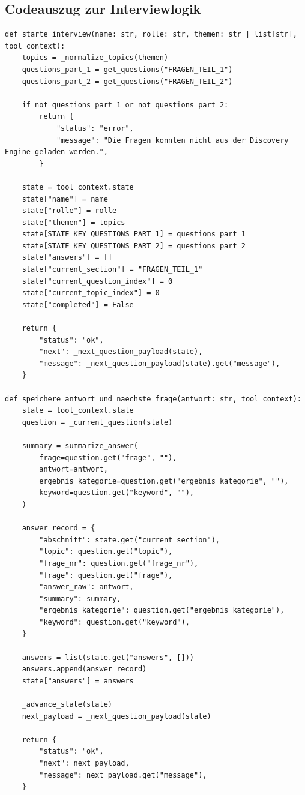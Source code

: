 \documentclass[
  10pt,
  ngerman,
  a4paper,
  toc=graduated,
  numbers=noenddot,
  headings=standardclasses,
  nonumberlist
]{scrartcl}
\begin{document}
\newpage
\subsection{Codeauszug zur Interviewlogik}
\label{anhang_interviewlogik}

\begin{lstlisting}[style=pythoncode, numbers=none, caption={Session State, Fragewechsel und Antwortspeicherung}, label={lst:interviewlogik}]
def starte_interview(name: str, rolle: str, themen: str | list[str], tool_context):
    topics = _normalize_topics(themen)
    questions_part_1 = get_questions("FRAGEN_TEIL_1")
    questions_part_2 = get_questions("FRAGEN_TEIL_2")

    if not questions_part_1 or not questions_part_2:
        return {
            "status": "error",
            "message": "Die Fragen konnten nicht aus der Discovery Engine geladen werden.",
        }

    state = tool_context.state
    state["name"] = name
    state["rolle"] = rolle
    state["themen"] = topics
    state[STATE_KEY_QUESTIONS_PART_1] = questions_part_1
    state[STATE_KEY_QUESTIONS_PART_2] = questions_part_2
    state["answers"] = []
    state["current_section"] = "FRAGEN_TEIL_1"
    state["current_question_index"] = 0
    state["current_topic_index"] = 0
    state["completed"] = False

    return {
        "status": "ok",
        "next": _next_question_payload(state),
        "message": _next_question_payload(state).get("message"),
    }

def speichere_antwort_und_naechste_frage(antwort: str, tool_context):
    state = tool_context.state
    question = _current_question(state)

    summary = summarize_answer(
        frage=question.get("frage", ""),
        antwort=antwort,
        ergebnis_kategorie=question.get("ergebnis_kategorie", ""),
        keyword=question.get("keyword", ""),
    )

    answer_record = {
        "abschnitt": state.get("current_section"),
        "topic": question.get("topic"),
        "frage_nr": question.get("frage_nr"),
        "frage": question.get("frage"),
        "answer_raw": antwort,
        "summary": summary,
        "ergebnis_kategorie": question.get("ergebnis_kategorie"),
        "keyword": question.get("keyword"),
    }

    answers = list(state.get("answers", []))
    answers.append(answer_record)
    state["answers"] = answers

    _advance_state(state)
    next_payload = _next_question_payload(state)

    return {
        "status": "ok",
        "next": next_payload,
        "message": next_payload.get("message"),
    }
\end{lstlisting}
\end{document}
